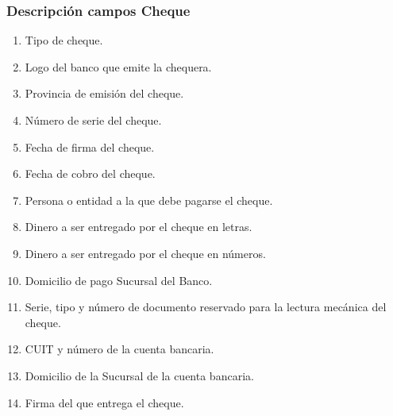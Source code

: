 \subsubsection{Descripción campos Cheque}
\begin{enumerate}
 \item Tipo de cheque.
 \item Logo del banco que emite la chequera.
 \item Provincia de emisi\'on del cheque.
 \item N\'umero de serie del cheque.
 \item Fecha de firma del cheque.
 \item Fecha de cobro del cheque.
 \item Persona o entidad a la que debe pagarse el cheque.
 \item Dinero a ser entregado por el cheque en letras.
 \item Dinero a ser entregado por el cheque en n\'umeros.
 \item Domicilio de pago Sucursal del Banco.
 \item Serie, tipo y número de documento reservado para la lectura mecánica del cheque.
 \item CUIT y n\'umero de la cuenta bancaria.
 \item Domicilio de la Sucursal de la cuenta bancaria.
 \item Firma del que entrega el cheque.
\end{enumerate}


\pagebreak
